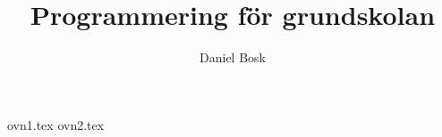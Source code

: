 \documentclass[a4paper]{book}
\title{Programmering för grundskolan}
\author{Daniel Bosk}
\begin{document}
\frontmatter

\maketitle

\clearpage
\vspace*{\fill}
\begin{quote}

\end{quote}
\clearpage

\tableofcontents

\mainmatter

{ovn1.tex}
{ovn2.tex}

\backmatter
\end{document}
